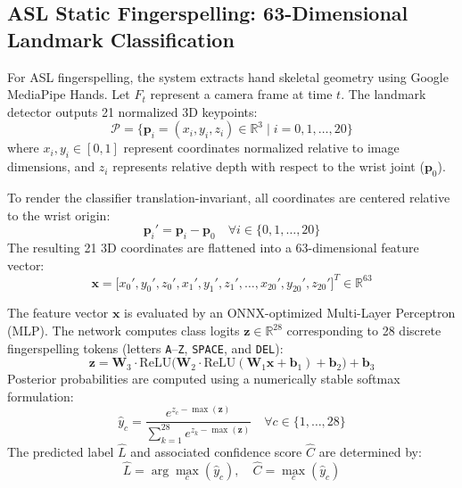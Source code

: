 \documentclass[12pt,a4paper]{report}
\begin{document}
\subsection{ASL Static Fingerspelling: 63-Dimensional Landmark Classification}
For ASL fingerspelling, the system extracts hand skeletal geometry using Google MediaPipe Hands. Let $F_t$ represent a camera frame at time $t$. The landmark detector outputs 21 normalized 3D keypoints:
\begin{equation}
\mathcal{P} = \big\{ \mathbf{p}_i = (x_i, y_i, z_i) \in \mathbb{R}^3 \;\big|\; i = 0, 1, \dots, 20 \big\}
\end{equation}
where $x_i, y_i \in [0, 1]$ represent coordinates normalized relative to image dimensions, and $z_i$ represents relative depth with respect to the wrist joint ($\mathbf{p}_0$).

To render the classifier translation-invariant, all coordinates are centered relative to the wrist origin:
\begin{equation}
\mathbf{p}_i' = \mathbf{p}_i - \mathbf{p}_0 \quad \forall i \in \{0, 1, \dots, 20\}
\end{equation}
The resulting 21 3D coordinates are flattened into a 63-dimensional feature vector:
\begin{equation}
\mathbf{x} = \big[ x_0', y_0', z_0', x_1', y_1', z_1', \dots, x_{20}', y_{20}', z_{20}' \big]^T \in \mathbb{R}^{63}
\end{equation}

The feature vector $\mathbf{x}$ is evaluated by an ONNX-optimized Multi-Layer Perceptron (MLP). The network computes class logits $\mathbf{z} \in \mathbb{R}^{28}$ corresponding to 28 discrete fingerspelling tokens (letters \texttt{A}--\texttt{Z}, \texttt{SPACE}, and \texttt{DEL}):
\begin{equation}
\mathbf{z} = \mathbf{W}_3 \cdot \text{ReLU}\Big(\mathbf{W}_2 \cdot \text{ReLU}(\mathbf{W}_1 \mathbf{x} + \mathbf{b}_1) + \mathbf{b}_2\Big) + \mathbf{b}_3
\end{equation}
Posterior probabilities are computed using a numerically stable softmax formulation:
\begin{equation}
\hat{y}_c = \frac{e^{z_c - \max(\mathbf{z})}}{\sum_{k=1}^{28} e^{z_k - \max(\mathbf{z})}} \quad \forall c \in \{1, \dots, 28\}
\end{equation}
The predicted label $\hat{L}$ and associated confidence score $\hat{C}$ are determined by:
\begin{equation}
\hat{L} = \arg\max_{c} (\hat{y}_c), \quad \hat{C} = \max_c (\hat{y}_c)
\end{equation}
\end{document}
